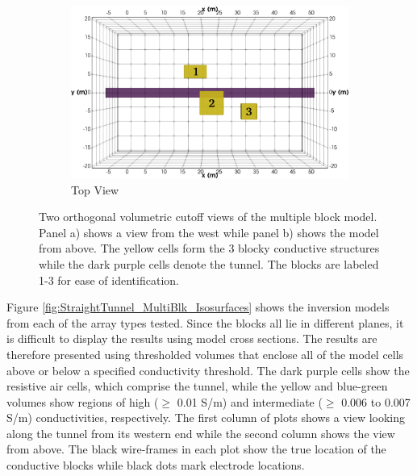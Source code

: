 \documentclass[preprint,authoryear,12pt]{elsarticle}
\begin{document}
\begin{figure}[htp]{}
\begin{center}
\begin{subfigure}{0.54\linewidth}
         \includegraphics[trim=0cm 0cm 0cm 0cm, clip=true,width=\linewidth]{./figures/Fig10b.png}
         \caption{Top View}
         \label{fig:StraightTunnel_MultiBlk_TrueMod_Top}
      \end{subfigure}
   \end{center}
\vspace{-0.4cm}
\caption{Two orthogonal volumetric cutoff views of the multiple block model. Panel a) shows a view from the west while panel b) shows the model from above. The yellow cells form the 3 blocky conductive structures while the dark purple cells denote the tunnel. The blocks are labeled 1-3 for ease of identification.}
\label{fig:StraightTunnel_MultiBlk_TrueMod}
\end{figure}


Figure \ref{fig:StraightTunnel_MultiBlk_Isosurfaces} shows the inversion models from each of the array types tested. Since the blocks all lie in different planes, it is difficult to display the results using model cross sections. The results are therefore presented using thresholded volumes that enclose all of the model cells above or below a specified conductivity threshold. The dark purple cells show the resistive air cells, which comprise the tunnel, while the yellow and blue-green volumes show regions of high ($\geq$ 0.01 S/m) and intermediate ($\geq$ 0.006 to 0.007 S/m) conductivities, respectively. The first column of plots shows a view looking along the tunnel from its western end while the second column shows the view from above. The black wire-frames in each plot show the true location of the conductive blocks while black dots mark electrode locations.
\end{document}
